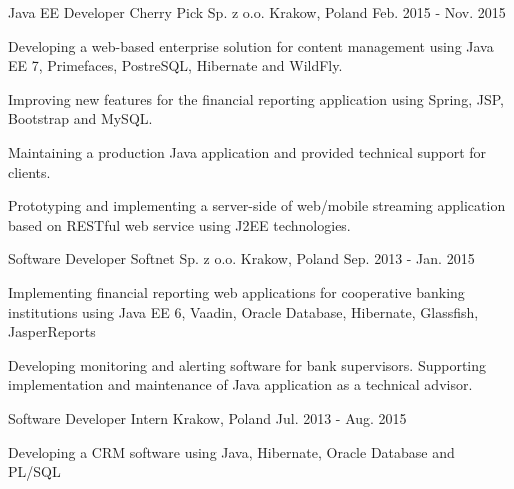 \begin{cventries}
  \cventry
    {Java EE Developer} %
    {Cherry Pick Sp. z o.o.} %
    {Krakow, Poland} %
    {Feb. 2015 - Nov. 2015} %
    {
      \begin{cvitems} %
        \item {Developing a web-based enterprise solution for content management using
Java EE 7, Primefaces, PostreSQL, Hibernate and WildFly.}
		\item {Improving new features for the financial reporting application using Spring, JSP, Bootstrap and MySQL.}
		\item {Maintaining a production Java application and provided technical support for clients.}
        \item {Prototyping and implementing a server-side of web/mobile
streaming application based on RESTful web service using J2EE technologies.}
      \end{cvitems}
    }

  \cventry
    {Software Developer} %
    {Softnet Sp. z o.o.} %
    {Krakow, Poland} %
    {Sep. 2013 - Jan. 2015} %
    {
      \begin{cvitems} %
       \item {Implementing financial reporting web applications for cooperative banking institutions using Java EE 6, Vaadin, Oracle Database, Hibernate, Glassfish, JasperReports}
	  \item {Developing monitoring and alerting software for bank supervisors. Supporting implementation and maintenance of Java application as a technical advisor.} 
      \end{cvitems}
    }
  \cventry
    {Software Developer Intern} %
    {} %
    {Krakow, Poland} %
    {Jul. 2013 - Aug. 2015} %
    {
      \begin{cvitems} %
       \item {Developing a CRM software using Java, Hibernate, Oracle Database and PL/SQL}
      \end{cvitems}
    }
\end{cventries}
